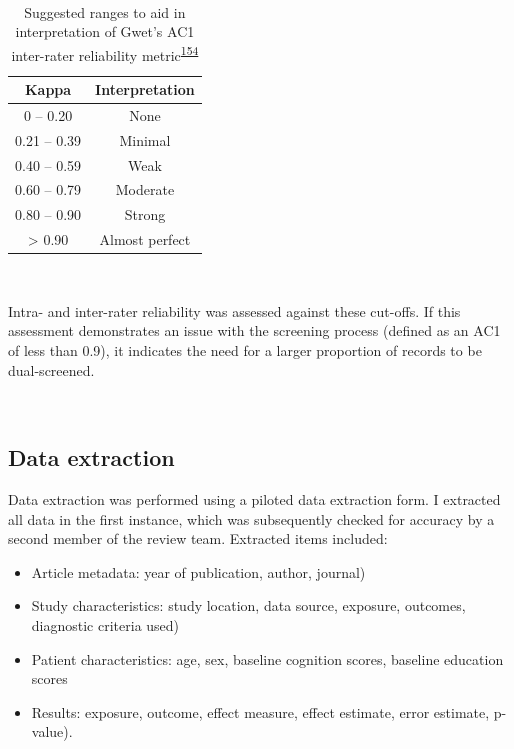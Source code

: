 \documentclass[a4paper, twoside]{templates/ociamthesis}
\providecommand{\tightlist}{%
  \setlength{\itemsep}{0pt}\setlength{\parskip}{0pt}}
\begin{document}
~





\begin{table}[H]

\caption[Ranges for Gwet's AC1]{\label{tab:gwet-table}Suggested ranges to aid in interpretation of Gwet's AC1 inter-rater reliability metric\textsuperscript{\protect\hyperlink{ref-mchugh2012}{154}}}
\centering
\begin{tabular}[t]{cc}
\toprule
\textbf{Kappa} & \textbf{Interpretation}\\
\midrule
0    – 0.20 & None\\
\midrule
0.21 – 0.39 & Minimal\\
\midrule
0.40 – 0.59 & Weak\\
\midrule
0.60 – 0.79 & Moderate\\
\midrule
0.80 – 0.90 & Strong\\
\midrule
\addlinespace
> 0.90 & Almost perfect\\
\bottomrule
\end{tabular}
\end{table}

~

Intra- and inter-rater reliability was assessed against these cut-offs. If this assessment demonstrates an issue with the screening process (defined as an AC1 of less than 0.9), it indicates the need for a larger proportion of records to be dual-screened.

~

\hypertarget{data-extraction}{%
\subsection{Data extraction}\label{data-extraction}}

Data extraction was performed using a piloted data extraction form. I extracted all data in the first instance, which was subsequently checked for accuracy by a second member of the review team. Extracted items included:

\begin{itemize}
\tightlist
\item
  Article metadata: year of publication, author, journal)
\item
  Study characteristics: study location, data source, exposure, outcomes, diagnostic criteria used)
\item
  Patient characteristics: age, sex, baseline cognition scores, baseline education scores
\item
  Results: exposure, outcome, effect measure, effect estimate, error estimate, p-value).
\end{itemize}
\end{document}
